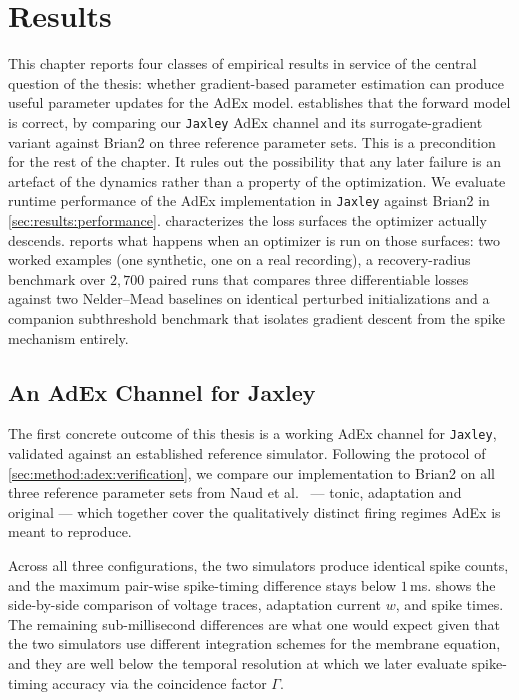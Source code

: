\chapter{Results}\label{ch:results}

This chapter reports four classes of empirical results in service of the central question of the thesis:
whether gradient-based parameter estimation can produce useful parameter updates for the \gls{AdEx} model.
 establishes that the forward model is correct, by comparing our \texttt{Jaxley} \gls{AdEx} channel and its surrogate-gradient variant against Brian2 on three reference parameter sets.
This is a precondition for the rest of the chapter.
It rules out the possibility that any later failure is an artefact of the dynamics rather than a property of the optimization.
We evaluate runtime performance of the \gls{AdEx} implementation in \texttt{Jaxley} against Brian2 in \cref{sec:results:performance}.
 characterizes the loss surfaces the optimizer actually descends.
 reports what happens when an optimizer is run on those surfaces:
two worked examples (one synthetic, one on a real recording),
a recovery-radius benchmark over $2{,}700$ paired runs that compares three differentiable losses against two Nelder--Mead baselines on identical perturbed initializations
and a companion subthreshold benchmark that isolates gradient descent from the spike mechanism entirely.

\section{An AdEx Channel for Jaxley}\label{sec:results:verification}

The first concrete outcome of this thesis is a working \gls{AdEx} channel for \texttt{Jaxley}, validated against an established reference simulator.
Following the protocol of \cref{sec:method:adex:verification}, we compare our implementation to Brian2 \cite{Stimberg2019} on all three reference parameter sets from Naud et al.~\cite{Naud2008} --- tonic, adaptation and original --- which together cover the qualitatively distinct firing regimes \gls{AdEx} is meant to reproduce.

Across all three configurations, the two simulators produce identical spike counts, and the maximum pair-wise spike-timing difference stays below $1$\,ms.
 shows the side-by-side comparison of voltage traces, adaptation current $w$, and spike times.
The remaining sub-millisecond differences are what one would expect given that the two simulators use different integration schemes for the membrane equation, and they are well below the temporal resolution at which we later evaluate spike-timing accuracy via the coincidence factor $\Gamma$.


